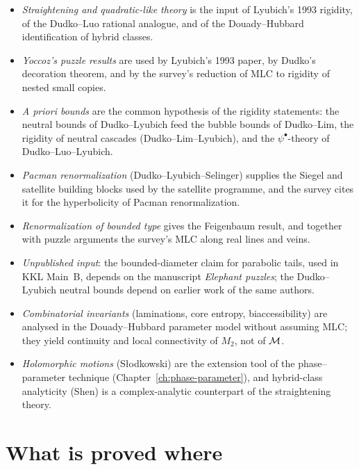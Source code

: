 \begin{itemize}
\item \emph{Straightening and quadratic-like theory} is the input of Lyubich's 1993 rigidity, of the Dudko--Luo rational
  analogue, and of the Douady--Hubbard identification of hybrid classes.
\item \emph{Yoccoz's puzzle results} are used by Lyubich's 1993 paper, by Dudko's decoration theorem, and by the
  survey's reduction of MLC to rigidity of nested small copies.
\item \emph{A priori bounds} are the common hypothesis of the rigidity statements: the neutral bounds of Dudko--Lyubich feed
  the bubble bounds of Dudko--Lim, the rigidity of neutral cascades (Dudko--Lim--Lyubich), and the $\psi^\bullet$-theory of
  Dudko--Luo--Lyubich.
\item \emph{Pacman renormalization} (Dudko--Lyubich--Selinger) supplies the Siegel and satellite building blocks used by
  the satellite programme, and the survey cites it for the hyperbolicity of Pacman renormalization.
\item \emph{Renormalization of bounded type} gives the Feigenbaum result, and together with puzzle arguments the survey's
  MLC along real lines and veins.
\item \emph{Unpublished input}: the bounded-diameter claim for parabolic tails, used in KKL Main~B, depends on the
  manuscript \emph{Elephant puzzles}; the Dudko--Lyubich neutral bounds depend on earlier work of the same authors.
\item \emph{Combinatorial invariants} (laminations, core entropy, biaccessibility) are analysed in the Douady--Hubbard
  parameter model without assuming MLC; they yield continuity and local connectivity of $M_2$, not of $\mathcal M$.
\item \emph{Holomorphic motions} (Słodkowski) are the extension tool of the phase--parameter technique (Chapter~\ref{ch:phase-parameter}),
  and hybrid-class analyticity (Shen) is a complex-analytic counterpart of the straightening theory.
\end{itemize}

\section{What is proved where}
\label{sec:approaches-status}

